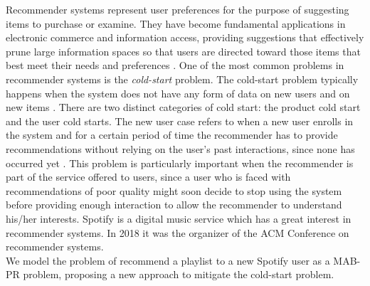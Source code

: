 Recommender systems represent user preferences for the purpose of suggesting items to purchase or examine. They have become fundamental applications in electronic commerce and information access, providing suggestions that effectively prune large information spaces so that users are directed toward those items that best meet their needs and preferences \citep{recsys1}. One of the most common problems in recommender systems is the \emph{cold-start} problem. The cold-start problem typically happens when the system does not have any form of data on new users and on
new items \citep{recsys2}. There are two distinct categories of cold start: the product cold start and the user cold starts. The new user case refers to when a new user enrolls in the system and for a certain period of time the recommender has to provide recommendations without relying on the user's past interactions, since none has occurred yet \citep{recsys3}. This problem is particularly important when the recommender is part of the service offered to users, since a user who is faced with recommendations of poor quality might soon decide to stop using the system before providing enough interaction to allow the recommender to understand his/her interests. Spotify is a digital music service which has a great interest in recommender systems. In 2018 it was the organizer of the ACM Conference on recommender systems.\\
We model the problem of recommend a playlist to a new Spotify user as a MAB-PR problem, proposing a new approach to mitigate the cold-start problem.


